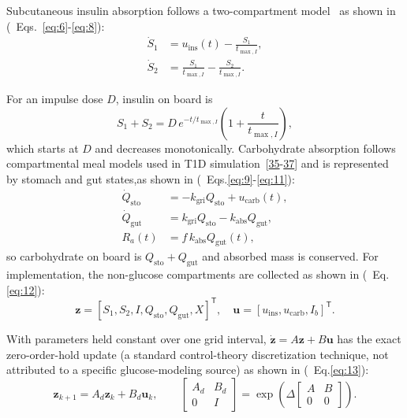 \documentclass[journal]{IEEEtran}
\begin{document}
Subcutaneous insulin absorption follows a two-compartment model~\cite{ref34} as shown in (\ Eqs.~\eqref{eq:6}-\eqref{eq:8}):
\begin{align}
\dot{S}_1 &= u_{\text{ins}}(t) - \frac{S_1}{t_{\max,I}}, \label{eq:6}\\
\dot{S}_2 &= \frac{S_1}{t_{\max,I}} - \frac{S_2}{t_{\max,I}}. \label{eq:7}
\end{align}

For an impulse dose $D$, insulin on board is
\begin{equation}
S_1 + S_2 = D\,e^{-t/t_{\max,I}}\left(1 + \frac{t}{t_{\max,I}}\right),
\label{eq:8}
\end{equation}
which starts at $D$ and decreases monotonically. Carbohydrate absorption follows compartmental meal models used in T1D simulation~[\hyperref[ref35label]{35}-\hyperref[ref37label]{37}] and is represented by stomach and gut states,as shown in (\ Eqs.\eqref{eq:9}-\eqref{eq:11}):
\begin{align}
\dot{Q}_{\text{sto}} &= -k_{\text{gri}} Q_{\text{sto}} + u_{\text{carb}}(t), \label{eq:9}\\
\dot{Q}_{\text{gut}} &= k_{\text{gri}} Q_{\text{sto}} - k_{\text{abs}} Q_{\text{gut}}, \label{eq:10}\\
R_a(t) &= f\, k_{\text{abs}} Q_{\text{gut}}(t), \label{eq:11}
\end{align}
so carbohydrate on board is $Q_{\text{sto}} + Q_{\text{gut}}$ and absorbed mass is conserved. For implementation, the non-glucose compartments are collected as shown in (\ Eq.\eqref{eq:12}):
\begin{equation}
\mathbf{z} = {[S_1, S_2, I, Q_{\text{sto}}, Q_{\text{gut}}, X]}^{\mathsf T}, \quad \mathbf{u} = {[u_{\text{ins}}, u_{\text{carb}}, I_b]}^{\mathsf T}.
\label{eq:12}
\end{equation}

With parameters held constant over one grid interval, $\dot{\mathbf{z}} = A\mathbf{z} + B\mathbf{u}$ has the exact zero-order-hold update (a standard control-theory discretization technique, not attributed to a specific glucose-modeling source) as shown in (\ Eq.\eqref{eq:13}):
\begin{equation}
\mathbf{z}_{k+1} = A_d \mathbf{z}_k + B_d \mathbf{u}_k, \qquad
\begin{bmatrix} A_d & B_d \\ 0 & I \end{bmatrix} = \exp\!\left(\Delta \begin{bmatrix} A & B \\ 0 & 0 \end{bmatrix}\right).
\label{eq:13}
\end{equation}
\end{document}
